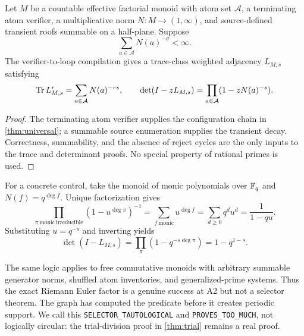 \begin{theorem}
\label{thm:factorial}
Let $M$ be a countable effective factorial monoid with atom set
$\mathcal A$, a terminating atom verifier, a multiplicative norm
$N:M\to(1,\infty)$, and source-defined transient roofs summable on a
half-plane.  Suppose
\[
\sum_{a\in\mathcal A}N(a)^{-\sigma}<\infty.
\]
The verifier-to-loop compilation gives a trace-class weighted adjacency
$L_{M,s}$ satisfying
\begin{equation}
\operatorname{Tr} L_{M,s}^r=\sum_{a\in\mathcal A}N(a)^{-rs},
\qquad
\det(I-zL_{M,s})
=\prod_{a\in\mathcal A}(1-zN(a)^{-s}).
\label{eq:factorial}
\end{equation}
\end{theorem}

\begin{proof}
The terminating atom verifier supplies the configuration chain in
\cref{thm:universal}; a summable source enumeration supplies the transient
decay.  Correctness, summability, and the absence of reject cycles are the
only inputs to the trace and determinant proofs.  No special property of
rational primes is used.
\end{proof}

For a concrete control, take the monoid of monic polynomials over $\mathbb F_q$ and
$N(f)=q^{\deg f}$.  Unique factorization gives
\[
\prod_{\pi\ \mathrm{monic\ irreducible}}
(1-u^{\deg\pi})^{-1}
=\sum_{f\ \mathrm{monic}}u^{\deg f}
=\sum_{d\ge0}q^du^d=\frac1{1-qu}.
\]
Substituting $u=q^{-s}$ and inverting yields
\begin{equation}
\det(I-L_{M,s})
=\prod_\pi(1-q^{-s\deg\pi})=1-q^{1-s}.
\label{eq:poly-control}
\end{equation}

The same logic applies to free commutative monoids with arbitrary summable
generator norms, shuffled atom inventories, and generalized-prime systems.
Thus the exact Riemann Euler factor is a genuine success at A2 but not a
selector theorem.  The graph has computed the predicate before it creates
periodic support.  We call this \texttt{SELECTOR\_TAUTOLOGICAL} and
\texttt{PROVES\_TOO\_MUCH}, not logically circular: the trial-division proof
in \cref{thm:trial} remains a real proof.
